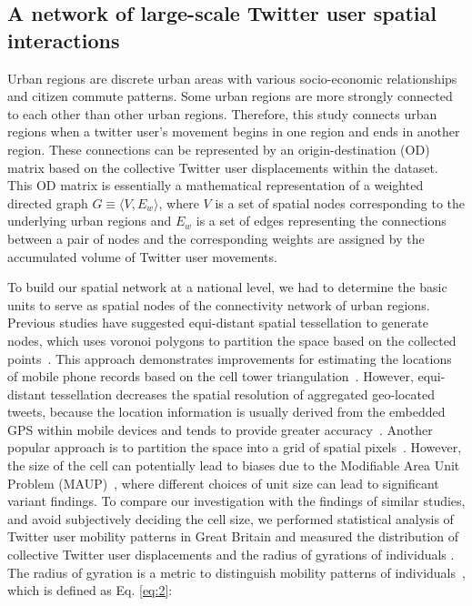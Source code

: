 \documentclass[10pt,letterpaper]{article}
\begin{document}
\subsection*{A network of large-scale Twitter user spatial interactions}
Urban regions are discrete urban areas with various socio-economic relationships and citizen commute patterns. 
Some urban regions are more strongly connected to each other than other urban regions.
Therefore, this study connects urban regions when a twitter user's movement begins in one region and ends in another region.
These connections can be represented by an origin-destination (OD) matrix based on the collective Twitter user displacements within the dataset.
This OD matrix is essentially a mathematical representation of a weighted directed graph $G\equiv\langle V, E_{w}\rangle$, where $V$ is a set of spatial nodes corresponding to the underlying urban regions and $E_{w}$ is a set of edges representing the connections between a pair of nodes and the corresponding weights are assigned by the accumulated volume of Twitter user movements.

To build our spatial network at a national level, we had to determine the basic units to serve as spatial nodes of the connectivity network of urban regions.
Previous studies have suggested equi-distant spatial tessellation to generate nodes, which uses voronoi polygons to partition the space based on the collected points~\cite{rinzivillo2012,zhong2014}. 
This approach demonstrates improvements for estimating the locations of mobile phone records based on the cell tower triangulation~\cite{gonzalez2008,qian2013}.
However, equi-distant tessellation decreases the spatial resolution of aggregated geo-located tweets, because the location information is usually derived from the embedded GPS within mobile devices and tends to provide greater accuracy~\cite{sakaki2010,zandbergen2009}.
Another popular approach is to partition the space into a grid of spatial pixels~\cite{liuPopMobility,ratti2010}.
However, the size of the cell can potentially lead to biases due to the Modifiable Area Unit Problem (MAUP)~\cite{openshaw1984,wong2009}, where different choices of unit size can lead to significant variant findings. 
To compare our investigation with the findings of similar studies, and avoid subjectively deciding the cell size, we performed statistical analysis of Twitter user mobility patterns in Great Britain and measured the distribution of collective Twitter user displacements and the radius of gyrations of individuals \cite{gonzalez2008,jurdak2015}.
The radius of gyration is a metric to distinguish mobility patterns of individuals~\cite{gonzalez2008}, which is defined as Eq. \eqref{eq:2}:
\end{document}
